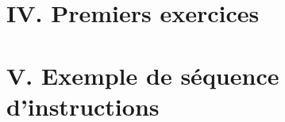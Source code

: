 

\usepackage{parcolumns}
\setlength{\parindent}{0pt}

 

\section*{IV. Premiers exercices}


\section*{V. Exemple de séquence d'instructions}



